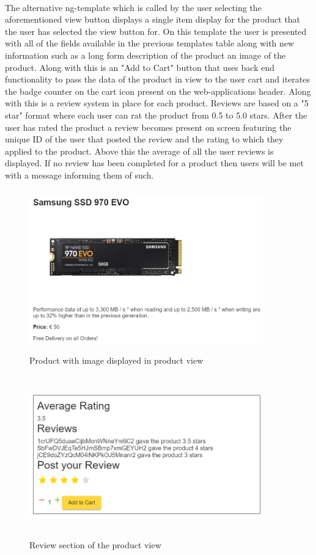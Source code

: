 \newpage

\paragraph{}
The alternative ng-template which is called by the user selecting the aforementioned view button displays a single item display for the product that the user has selected the view button for. On this template the user is presented with all of the fields available in the previous templates table along with new information such as a long form description of the product an image of the product. Along with this is an "Add to Cart" button that uses back end functionality to pass the data of the product in view to the user cart and iterates the badge counter on the cart icon present on the web-applications header. Along with this is a review system in place for each product. Reviews are based on a "5 star" format where each user can rat the product from 0.5 to 5.0 stars. After the user has rated the product a review becomes present on screen featuring the unique ID of the user that posted the review and the rating to which they applied to the product. Above this the average of all the user reviews is displayed. If no review has been completed for a product then users will be met with a message informing them of such. 


\begin{figure}[h!]
    	\caption{Product with image displayed in product view}
	\centering
	\includegraphics[width=0.9\textwidth, height=7cm]{images/productview.png}
\end{figure}
\newpage
\begin{figure}[h!]
    	\caption{Review section of the product view}
	\centering
	\includegraphics[width=0.9\textwidth, height=7cm]{images/review.png}
\end{figure}

